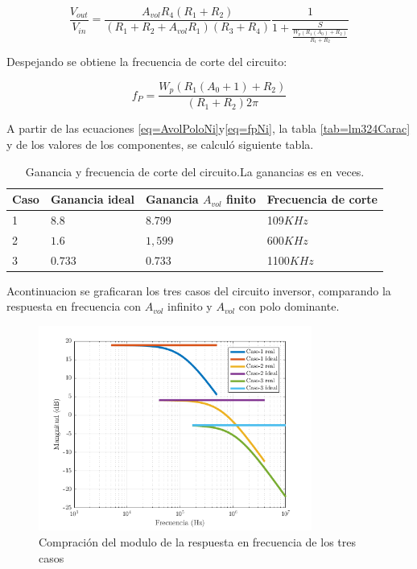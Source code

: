 \documentclass[../../main.tex]{subfiles}
\begin{document}
\begin{equation}
 \frac{V_{out}}{V_{in}}=\frac{A_{vol}R_{4}(R_{1}+R_{2})}{(R_{1}+R_{2}+A_{vol}	R_{1})(R_{3}+R_{4})}  \frac{1}{1 + \frac{S}{\frac{W_{p}(R_{1}(A_{0})+R_{2})}{R_{1}+R_{2}}}}\label{eq=AvolPoloNi}
\end{equation}

Despejando se obtiene la frecuencia de corte del circuito:

\begin{equation}
f_{P}=\frac{W_{p}(R_{1}(A_{0}+1)+R_{2})}{(R_{1}+R_{2})2 \pi } \label{eq=fpNi}
\end{equation}

A partir de las ecuaciones \ref{eq=AvolPoloNi}y\ref{eq=fpNi}, la tabla \ref{tab=lm324Carac} y de los valores de los componentes, se calculó siguiente tabla.

\begin{table}[h]
\begin{center}
\begin{tabular}{|l|l|l|l|}
\hline
Caso &Ganancia ideal & Ganancia $A_{vol}$ finito & Frecuencia de corte\\
\hline \hline
1 & $8.8$ & 8.799 & 109$KHz$ \\ \hline
2 & $1.6$ &  $1,599 $ &  600$KHz$  \\ \hline
3 & $0.733$ &0.733 &1100$KHz$\\ \hline
\end{tabular}
\caption{Ganancia y frecuencia de corte del circuito.La ganancias es en veces.} 
\label{tab=gananciayFrecCorteNi}
\end{center}
\end{table}
Acontinuacion se graficaran los tres casos del circuito inversor, comparando la respuesta en frecuencia con  $A_{vol}$ infinito y $A_{vol}$ con polo dominante.

\begin{figure}[H]
\centering
\includegraphics[width=0.8\textwidth]{real_ideal_mag_n}
\caption{Compración del modulo de la respuesta en frecuencia de los tres casos}
\end{figure}
\end{document}
